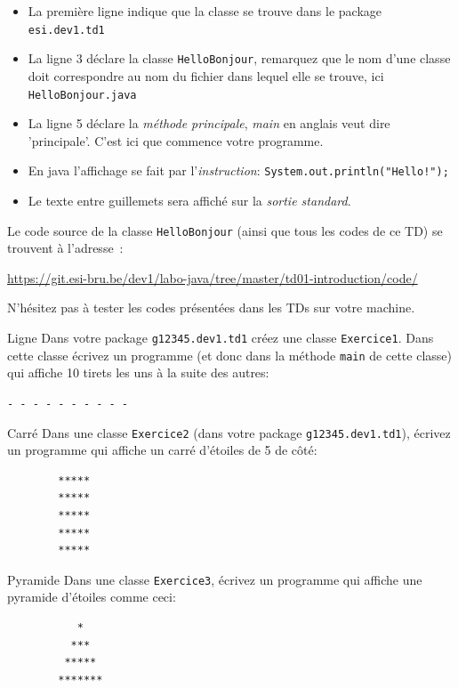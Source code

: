 \documentclass[a4paper,11pt]{article}
\newcommand{\publicbasepath}{https://git.esi-bru.be/dev1/labo-java/tree/master/td01-introduction}
\renewcommand{\listingpublicpath}{\publicbasepath/code/}
\begin{document}
	\begin{itemize}
		\item La première ligne indique que la classe se trouve dans le package \texttt{esi.dev1.td1}
		\item La ligne 3 déclare la classe \texttt{HelloBonjour}, remarquez que le nom d'une classe 
			doit correspondre au nom du fichier dans lequel elle se trouve, ici \texttt{HelloBonjour.java}
		\item La ligne 5 déclare la \emph{méthode principale}, \emph{main} en anglais veut dire 'principale'.
			C'est ici que commence votre programme.
		\item En java l'affichage se fait par l'\emph{instruction}: \texttt{System.out.println("Hello!");}
		\item Le texte entre guillemets sera affiché sur la \emph{sortie standard}.
	\end{itemize}

	Le code source de la classe \texttt{HelloBonjour} (ainsi que tous les codes de ce TD) se trouvent à l'adresse~: 
	
	\url{\listingpublicpath}
	
	N'hésitez pas à tester les codes présentées dans les TDs sur votre machine.



	\begin{Exercice}{Ligne}
		Dans votre package \texttt{g12345.dev1.td1} créez une classe \texttt{Exercice1}.
		Dans cette classe écrivez un programme  (et donc dans la méthode \texttt{main} de cette classe) 
		qui affiche 10 tirets les uns à la suite des autres:

		\texttt{- - - - - - - - - -}
	\end{Exercice}
	
	\begin{Exercice}{Carré}
		Dans une classe \texttt{Exercice2} (dans votre package \texttt{g12345.dev1.td1}), écrivez un programme qui affiche un carré d'étoiles de 5 de côté:

		\begin{verbatim}
		*****
		*****
		*****
		*****
		*****
		\end{verbatim}
	\end{Exercice}

	\begin{Exercice}{Pyramide}
		Dans une classe \texttt{Exercice3}, écrivez un programme qui affiche une pyramide d'étoiles comme ceci:

		\begin{verbatim}
		   *
		  ***
		 *****
		*******
		\end{verbatim}
	\end{Exercice}
\end{document}
